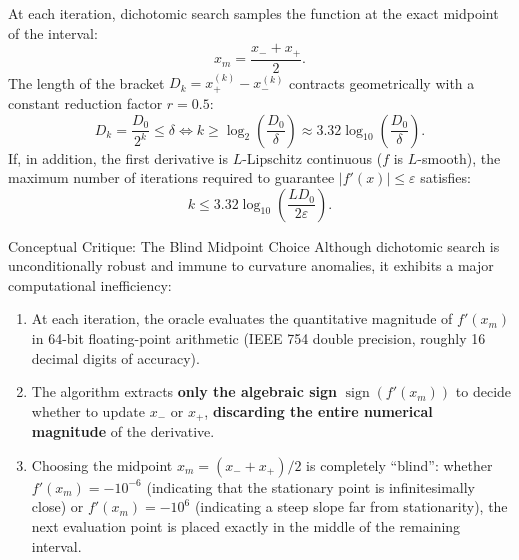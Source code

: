 At each iteration, dichotomic search samples the function at the exact midpoint of the interval:
\begin{equation}
    x_m = \frac{x_- + x_+}{2}.
\end{equation}
The length of the bracket $D_k = x_+^{(k)} - x_-^{(k)}$ contracts geometrically with a constant reduction factor $r = 0.5$:
\begin{equation}
    D_k = \frac{D_0}{2^k} \le \delta \iff k \ge \log_2\left(\frac{D_0}{\delta}\right) \approx 3.32 \log_{10}\left(\frac{D_0}{\delta}\right).
\end{equation}
If, in addition, the first derivative is $L$-Lipschitz continuous ($f$ is $L$-smooth), the maximum number of iterations required to guarantee $|f'(x)| \le \varepsilon$ satisfies:
\begin{equation}
    k \le 3.32 \log_{10}\left(\frac{L D_0}{2\varepsilon}\right).
\end{equation}

\begin{alertblock}{Conceptual Critique: The Blind Midpoint Choice}
Although dichotomic search is unconditionally robust and immune to curvature anomalies, it exhibits a major computational inefficiency:
\begin{enumerate}
    \item At each iteration, the oracle evaluates the quantitative magnitude of $f'(x_m)$ in 64-bit floating-point arithmetic (IEEE 754 double precision, roughly 16 decimal digits of accuracy).
    \item The algorithm extracts \textbf{only the algebraic sign} $\operatorname{sign}(f'(x_m))$ to decide whether to update $x_-$ or $x_+$, \textbf{discarding the entire numerical magnitude} of the derivative.
    \item Choosing the midpoint $x_m = (x_- + x_+)/2$ is completely ``blind'': whether $f'(x_m) = -10^{-6}$ (indicating that the stationary point is infinitesimally close) or $f'(x_m) = -10^6$ (indicating a steep slope far from stationarity), the next evaluation point is placed exactly in the middle of the remaining interval.
\end{enumerate}
\end{alertblock}

